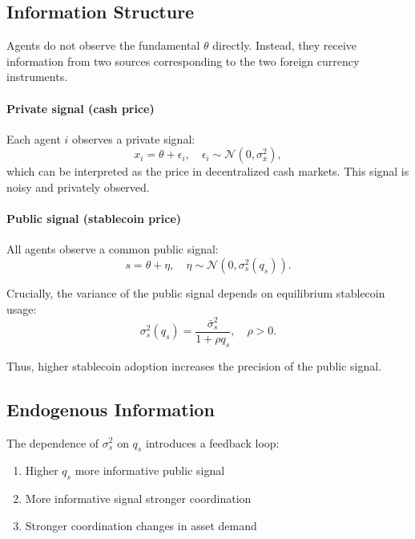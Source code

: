 \subsection{Information Structure}

Agents do not observe the fundamental $\theta$ directly. Instead, they receive information from two sources corresponding to the two foreign currency instruments.

\paragraph{Private signal (cash price)}
Each agent $i$ observes a private signal:
\begin{equation}
x_i = \theta + \epsilon_i, \quad \epsilon_i \sim \mathcal{N}(0, \sigma_x^2),
\end{equation}
which can be interpreted as the price in decentralized cash markets. This signal is noisy and privately observed.

\paragraph{Public signal (stablecoin price)}
All agents observe a common public signal:
\begin{equation}
s = \theta + \eta, \quad \eta \sim \mathcal{N}(0, \sigma_s^2(q_s)).
\end{equation}

Crucially, the variance of the public signal depends on equilibrium stablecoin usage:
\begin{equation}
\sigma_s^2(q_s) = \frac{\bar{\sigma}_s^2}{1 + \rho q_s}, \quad \rho > 0.
\end{equation}

Thus, higher stablecoin adoption increases the precision of the public signal.

\subsection{Endogenous Information}

The dependence of $\sigma_s^2$ on $q_s$ introduces a feedback loop:
\begin{enumerate}
\item Higher $q_s$ \rightarrow more informative public signal
\item More informative signal \rightarrow stronger coordination
\item Stronger coordination \rightarrow changes in asset demand
\end{enumerate}

